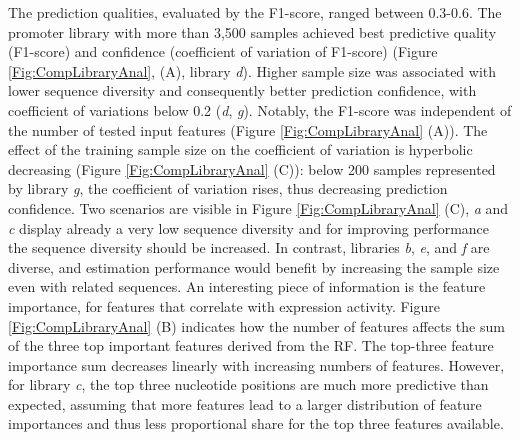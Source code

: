 \documentclass[utf8]{frontiersSCNS} %
\begin{document}
The prediction qualities, evaluated by the F1-score, ranged between 0.3-0.6. The promoter library with more than 3,500 samples achieved best predictive quality (F1-score) and confidence (coefficient of variation of F1-score) (Figure \ref{Fig:CompLibraryAnal}, (A), library \textit{d}). Higher sample size was associated with lower sequence diversity and consequently better prediction confidence, with coefficient of variations below 0.2 (\textit{d}, \textit{g}). Notably, the F1-score was independent of the number of tested input features (Figure \ref{Fig:CompLibraryAnal} (A)). The effect of the training sample size on the coefficient of variation is hyperbolic decreasing (Figure \ref{Fig:CompLibraryAnal} (C)): below 200 samples represented by library \textit{g}, the coefficient of variation rises, thus decreasing prediction confidence. Two scenarios are visible in Figure \ref{Fig:CompLibraryAnal} (C), \textit{a} and \textit{c} display already a very low sequence diversity and for improving performance the sequence diversity should be increased. In contrast, libraries \textit{b}, \textit{e}, and \textit{f} are diverse, and estimation performance would benefit by increasing the sample size even with related sequences. An interesting piece of information is the feature importance, for features that correlate with expression activity. Figure \ref{Fig:CompLibraryAnal} (B) indicates how the number of features affects the sum of the three top important features derived from the RF. The top-three feature importance sum decreases linearly with increasing numbers of features. However, for library \textit{c}, the top three nucleotide positions are much more predictive than expected, assuming that more features lead to a larger distribution of feature importances and thus less proportional share for the top three features available. 
\end{document}

